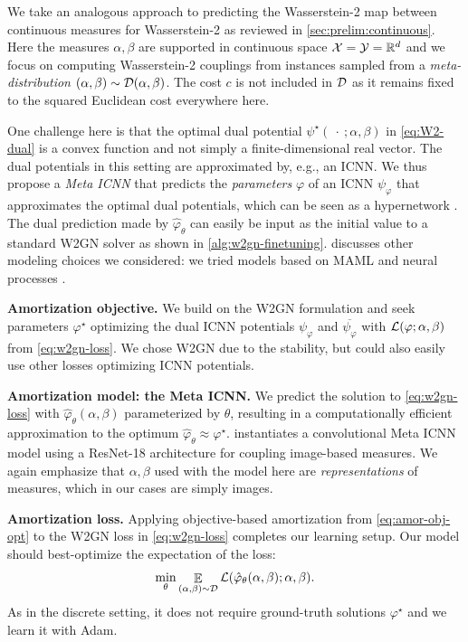\documentclass{article}
\newcommand{\eg}{e.g.\xspace}
\begin{document}
We take an analogous approach to predicting the Wasserstein-2
map between continuous measures for Wasserstein-2 as reviewed in
\cref{sec:prelim:continuous}.
Here the measures $\alpha,\beta$ are supported in continuous space
${\mathcal{X}}={\mathcal{Y}}=\mathbb{R}^d$ and we focus on computing Wasserstein-2 couplings
from instances sampled from a \emph{meta-distribution}
$(\alpha,\beta)\sim{\mathcal{D}}(\alpha,\beta)$.
The cost $c$ is not included in ${\mathcal{D}}$ as it remains fixed to the
squared Euclidean cost everywhere here.

One challenge here is that the optimal dual potential
$\psi^\star(\ \cdot\ ; \alpha, \beta)$
in \cref{eq:W2-dual} is a convex function and not simply
a finite-dimensional real vector.
The dual potentials in this setting are approximated by, \eg, an ICNN.
We thus propose a \emph{Meta ICNN} that predicts the \emph{parameters}
$\varphi$ of an ICNN $\psi_\varphi$ that approximates the optimal
dual potentials, which can be seen as a hypernetwork
\citep{stanley2009hypercube,ha2016hypernetworks}.
The dual prediction made by $\hat \varphi_\theta$
can easily be input as the initial value to a standard W2GN solver
as shown in \cref{alg:w2gn-finetuning}.
 discusses other modeling
choices we considered: we tried models based on
MAML \citep{pmlr-v70-finn17a} and neural processes
\citep{garnelo2018neural,garnelo2018conditional}.

\textbf{Amortization objective.}
We build on the W2GN formulation \citep{korotin2019wasserstein}
and seek parameters $\varphi^\star$ optimizing the
dual ICNN potentials $\psi_\varphi$ and $\overline{\psi_\varphi}$
with ${\mathcal{L}}(\varphi; \alpha, \beta)$ from \cref{eq:w2gn-loss}.
We chose W2GN due to the stability, but could also easily
use other losses optimizing ICNN potentials.

\textbf{Amortization model: the Meta ICNN.}
We predict the solution to \cref{eq:w2gn-loss} with
$\hat \varphi_\theta(\alpha, \beta)$ parameterized by $\theta$,
resulting in a computationally efficient approximation to
the optimum $\hat \varphi_\theta \approx \varphi^\star$.
 instantiates a convolutional Meta ICNN
model using a ResNet-18 \citep{he2016identity} architecture for
coupling image-based measures.
We again emphasize that $\alpha,\beta$ used with the model
here are \emph{representations} of measures, which in our cases are simply images.

\textbf{Amortization loss.}
Applying objective-based amortization from \cref{eq:amor-obj-opt} to
the W2GN loss in \cref{eq:w2gn-loss} completes our learning setup.
Our model should best-optimize the expectation of the loss:
\begin{equation}
  \min_\theta \mathop{\mathbb{E}}_{(\alpha,\beta)\sim{\mathcal{D}}}
    {\mathcal{L}}(\hat \varphi_\theta(\alpha, \beta); \alpha, \beta).
  \label{eq:amor-w2gn-loss}
\end{equation}
As in the discrete setting, it does not require ground-truth
solutions $\varphi^\star$ and we learn it with Adam.
\end{document}
